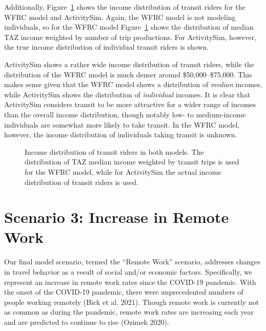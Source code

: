 \documentclass[fancy, twoside, mastersfancy, ms]{byuthesis}
\begin{document}
Additionally, Figure~\ref{fig-tr-se-income-dist} shows the income
distribution of transit riders for the WFRC model and ActivitySim.
Again, the WFRC model is not modeling individuals, so for the WFRC model
Figure~\ref{fig-tr-se-income-dist} shows the distribution of median TAZ
income weighted by number of trip productions. For ActivitySim, however,
the true income distribution of individual transit riders is shown.

ActivitySim shows a rather wide income distribution of transit riders,
while the distribution of the WFRC model is much denser around
\$50,000--\$75,000. This makes sense given that the WFRC model shows a
distribution of \emph{median} incomes, while ActivitySim shows the
distribution of \emph{individual} incomes. It is clear that ActivitySim
considers transit to be more attractive for a wider range of incomes
than the overall income distribution, though notably low- to
medium-income individuals are somewhat more likely to take transit. In
the WFRC model, however, the income distribution of individuals taking
transit is unknown.

\begin{figure}


\caption[Income distribution of transit riders in both
models.]{\label{fig-tr-se-income-dist}Income distribution of transit
riders in both models. The distribution of TAZ median income weighted by
transit trips is used for the WFRC model, while for ActivitySim the
actual income distribution of transit riders is used.}

\end{figure}%


\chapter{Scenario 3: Increase in Remote Work}\label{sec-wfh}

Our final model scenario, termed the ``Remote Work'' scenario, addresses
changes in travel behavior as a result of social and/or economic
factors. Specifically, we represent an increase in remote work rates
since the COVID-19 pandemic. With the onset of the COVID-19 pandemic,
there were unprecedented numbers of people working remotely (Bick et al.
2021). Though remote work is currently not as common as during the
pandemic, remote work rates are increasing each year and are predicted
to continue to rise (Ozimek 2020).
\end{document}

